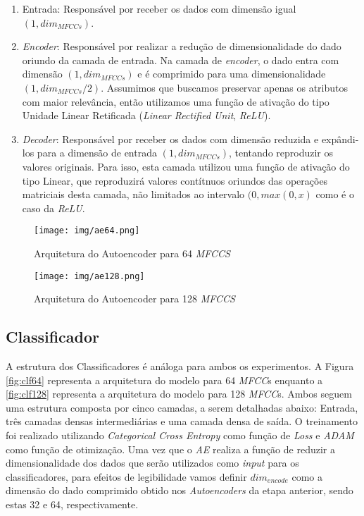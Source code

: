 \begin{enumerate}
    \item Entrada: Responsável por receber os dados com dimensão igual $(1, dim_{MFCCs})$.
    \item \textit{Encoder}: Responsável por realizar a redução de dimensionalidade do dado oriundo da camada de entrada. Na camada de \textit{encoder}, o dado entra com dimensão $(1, dim_{MFCCs})$ e é comprimido para uma dimensionalidade $(1, dim_{MFCCs}/2)$. Assumimos que buscamos preservar apenas os atributos com maior relevância, então utilizamos uma função de ativação do tipo Unidade Linear Retificada (\textit{Linear Rectified Unit}, \textit{ReLU}).
    \item \textit{Decoder}: Responsável por receber os dados com dimensão reduzida e expândi-los para a dimensão de entrada $(1, dim_{MFCCs})$, tentando reproduzir os valores originais. Para isso, esta camada utilizou uma função de ativação do tipo Linear, que reproduzirá valores contítnuos oriundos das operações matriciais desta camada, não limitados ao intervalo $(0, max(0, x)$ como é o caso da \textit{ReLU}.
\end{enumerate}

\begin{figure}[h]
    \centering
    \begin{minipage}[b]{0.4\linewidth}
        \centering
        \texttt{[image: img/ae64.png]}
        \caption{\label{fig:ae64}Arquitetura do Autoencoder para 64 \textit{MFCCS}}
    \end{minipage}
    \begin{minipage}[b]{0.4\linewidth}
        \centering
        \texttt{[image: img/ae128.png]}
        \caption{\label{fig:ae128}Arquitetura do Autoencoder para 128 \textit{MFCCS}}
    \end{minipage}
\end{figure}

\subsection{Classificador}

A estrutura dos Classificadores é análoga para ambos os experimentos. A Figura \ref{fig:clf64} representa a arquitetura do modelo para 64 \textit{MFCC}s enquanto a \ref{fig:clf128} representa a arquitetura do modelo para 128 \textit{MFCC}s. Ambos seguem uma estrutura composta por cinco camadas, a serem detalhadas abaixo: Entrada, três camadas densas intermediárias e uma camada densa de saída. O treinamento foi realizado utilizando \textit{Categorical Cross Entropy} como função de \textit{Loss} e \textit{ADAM} como função de otimização. Uma vez que o \textit{AE} realiza a função de reduzir a dimensionalidade dos dados que serão utilizados como \textit{input} para os classificadores, para efeitos de legibilidade vamos definir $dim_{encode}$ como a dimensão do dado comprimido obtido nos \textit{Autoencoders} da etapa anterior, sendo estas 32 e 64, respectivamente.

